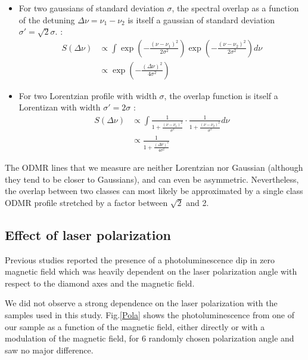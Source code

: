 \documentclass[preprintnumbers,amsmath,amssymb,onecolumn,12pt]{revtex4-2}\usepackage{graphicx}%
\begin{document}
\begin{itemize}
\item For two gaussians of standard deviation $\sigma$, the spectral overlap as a function of the detuning $\Delta \nu = \nu_1-\nu_2$ is itself a gaussian of standard deviation $\sigma'=\sqrt{2} \sigma$. :
\begin{align*}
S(\Delta \nu)&\propto \int \exp(-\frac{(\nu-\nu_1)^2}{2\sigma^2})\exp(-\frac{(\nu-\nu_2)^2}{2\sigma^2}) d\nu \\
&\propto\exp(-\frac{(\Delta \nu)^2}{4\sigma^2})
\end{align*}

\item For two Lorentzian profile with width $\sigma$, the overlap function is itself a Lorentizan with width $\sigma'=2\sigma$ :
\begin{align*}
S(\Delta \nu)&\propto \int \frac{1}{1+ \frac{(\nu-\nu_1)^2}{\sigma^2}}\cdot \frac{1}{1+ \frac{(\nu-\nu_2)^2}{\sigma^2}} d\nu \\
&\propto\frac{1}{1+ \frac{(\Delta \nu)^2}{4\sigma^2}}
\end{align*}
\end{itemize}

The ODMR lines that we measure are neither Lorentzian nor Gaussian (although they tend to be closer to Gaussians), and can even be asymmetric. Nevertheless, the overlap between two classes can most likely be approximated by a single class ODMR profile stretched by a factor between $\sqrt{2}$ and 2.


\subsection{Effect of laser polarization}
Previous studies \cite{anishchik2015low, filimonenko2020weak} reported the presence of a photoluminescence dip in zero magnetic field which was heavily dependent on the laser polarization angle with respect to the diamond axes and the magnetic field. 

We did not observe a strong dependence on the laser polarization with the samples used in this study. Fig.\ref{Pola} shows the photoluminescence from one of our sample as a function of the magnetic field, either directly or with a modulation of the magnetic field, for 6 randomly chosen polarization angle and saw no major difference. 
\end{document}
